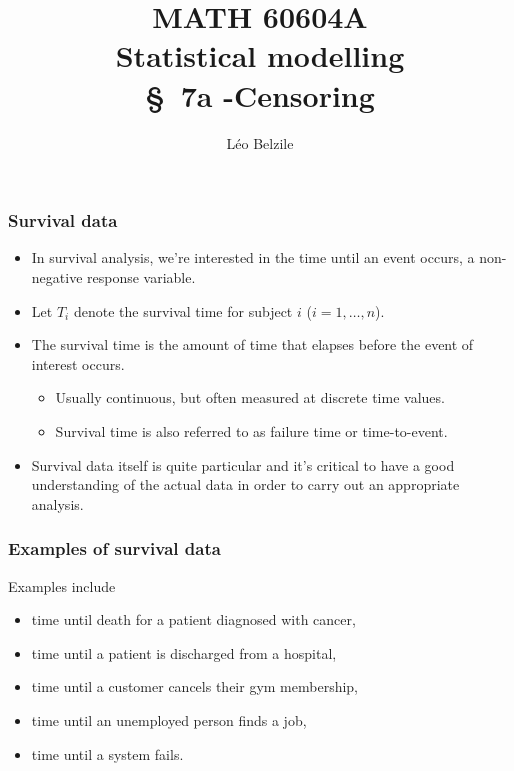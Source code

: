 \documentclass{beamer}
\title[\color{white}{MATH 60604A \S~7a -Censoring}]{\texorpdfstring{MATH 60604A \\Statistical modelling \\ \S~7a -Censoring}{MATH 60604A \\Statistical modelling \\ \S~7a -Censoring}}
\author{Léo Belzile}
\institute{HEC Montréal\\
Department of Decision Sciences}
\date{}
\begin{document}
\frame{\titlepage}
\begin{frame}
\frametitle{Survival data}
\begin{itemize} 
\item In \alert{survival analysis}, we're interested in the time until an event occurs, a non-negative response variable.
\item Let $T_i$ denote the \alert{survival time} for subject $i$ ($i=1, \ldots, n$).
\item The survival time is the amount of time that elapses before the event of interest occurs. 
\begin{itemize}
\vp \vp
\item Usually continuous, but often measured at discrete time values.
\item Survival time is also referred to as \alert{failure time} or \alert{time-to-event}.
\end{itemize}
\item Survival data itself is quite particular and it's critical to have a good understanding of the actual data in order to carry out an appropriate analysis.
\end{itemize}
\end{frame}

\begin{frame}
\frametitle{Examples of survival data }
Examples include
\begin{itemize}
\vp \vp
\item time until death for a patient diagnosed with cancer,
\item time until a patient is discharged from a hospital,
\item time until a customer cancels their gym membership,
\item time until an unemployed person finds a job,
\item time until a system fails.
\end{itemize}
\end{frame}
\end{document}
